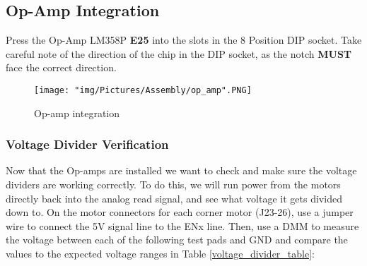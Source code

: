 \documentclass{article}
\begin{document}
\subsection{Op-Amp Integration}

Press the Op-Amp LM358P \textbf{E25} into the slots in the 8 Position DIP socket. Take careful note of the direction of the chip in the DIP socket, as the notch \textbf{MUST} face the correct direction.

\begin{figure}[H]
  \centering
    \texttt{[image: "img/Pictures/Assembly/op\_amp".PNG]}
  \caption{Op-amp integration}
\end{figure}

\subsubsection{Voltage Divider Verification}

Now that the Op-amps are installed we want to check and make sure the voltage dividers are working correctly. To do this, we will run power from the motors directly back into the analog read signal, and see what voltage it gets divided down to. On the motor connectors for each corner motor (J23-26), use a jumper wire to connect the 5V signal line to the ENx line. Then, use a DMM to measure the voltage between each of the following test pads and GND and compare the values to the expected voltage ranges in Table \ref{voltage_divider_table}:
\end{document}
